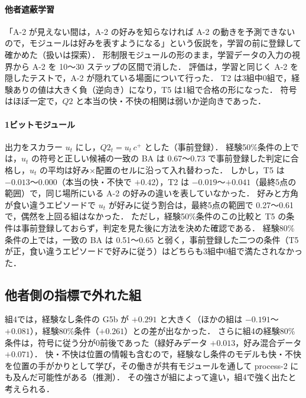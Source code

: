 \paragraph{他者遮蔽学習}
「A-2 が見えない間は，A-2 の好みを知らなければ A-2 の動きを予測できないので，モジュールは好みを表すようになる」という仮説を，学習の前に登録して確かめた（扱いは探索）．
形制限モジュールの形のまま，学習データの入力の視界から A-2 を 10〜30 ステップの区間で消した．
評価は，学習と同じく A-2 を隠したテストで，A-2 が隠れている場面について行った．
T2 は3組中0組で，経験ありの値は大きく負（逆向き）になり，T5 は1組で合格の形になった．
符号はほぼ一定で，$Q2$ と本当の快・不快の相関は弱いか逆向きであった．

\paragraph{1ビットモジュール}
出力をスカラー $u_t$ にし，$Q2_t=u_t\,c^{+}$ とした（事前登録）．
経験50\%条件の上では，$u_t$ の符号と正しい候補の一致の BA は 0.67〜0.73 で事前登録した判定に合格し，$u_t$ の平均は好み×配置のセルに沿って入れ替わった．
しかし，T5 は $-0.013$〜$0.000$（本当の快・不快で $+0.42$），T2 は $-0.019$〜$+0.041$（最終5点の範囲）で，同じ場所にいる A-2 の好みの違いを表していなかった．
好みと方角が食い違うエピソードで $u_t$ が好みに従う割合は，最終5点の範囲で 0.27〜0.61 で，偶然を上回る組はなかった．
ただし，経験50\%条件のこの比較と T5 の条件は事前登録しておらず，判定を見た後に方法を決めた確認である．
経験80\%条件の上では，一致の BA は 0.51〜0.65 と弱く，事前登録した二つの条件（T5 が正，食い違うエピソードで好みに従う）はどちらも3組中0組で満たされなかった．

\subsection{他者側の指標で外れた組}
組4では，経験なし条件の G5b が $+0.291$ と大きく（ほかの組は $-0.191$〜$+0.081$），経験80\%条件（$+0.261$）との差が出なかった．
さらに組4の経験80\%条件は，符号に従う分が0前後であった（緑好みデータ $+0.013$，好み混合データ $+0.071$）．
快・不快は位置の情報も含むので，経験なし条件のモデルも快・不快を位置の手がかりとして学び，その働きが共有モジュールを通して process-2 にも及んだ可能性がある（推測）．
その強さが組によって違い，組4で強く出たと考えられる．

